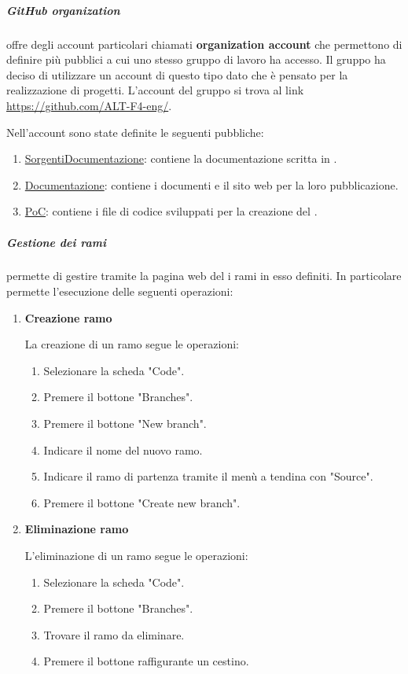 \subparagraph{GitHub organization}
 offre degli account particolari chiamati \textbf{organization account} che permettono di definire più  pubblici a cui uno stesso gruppo di lavoro ha accesso.
Il gruppo ha deciso di utilizzare un account di questo tipo dato che è pensato per la realizzazione di progetti.
L'account del gruppo si trova al link \href{https://github.com/ALT-F4-eng/}{https://github.com/ALT-F4-eng/}.

Nell'account sono state definite le seguenti  pubbliche:
\begin{enumerate}
    \item \href{https://github.com/ALT-F4-eng/SorgentiDocumentazione}{SorgentiDocumentazione}: contiene la documentazione scritta in .
    \item \href{https://github.com/ALT-F4-eng/Documentazione}{Documentazione}: contiene i documenti  e il sito web per la loro pubblicazione.
    \item \href{https://github.com/ALT-F4-eng/PoC}{PoC}: contiene i file di codice sviluppati per la creazione del .
\end{enumerate}

\subparagraph{Gestione dei rami}
 permette di gestire tramite la pagina web del  i rami in esso definiti.
In particolare permette l'esecuzione delle seguenti operazioni:
\begin{enumerate}
    \item \textbf{Creazione ramo}
    
    La creazione di un ramo segue le operazioni:
    \begin{enumerate}
        \item Selezionare la scheda "Code".
        \item Premere il bottone "Branches".
        \item Premere il bottone "New branch".
        \item Indicare il nome del nuovo ramo.
        \item Indicare il ramo di partenza tramite il menù a tendina con  "Source".
        \item Premere il bottone "Create new branch".
    \end{enumerate}

    \item \textbf{Eliminazione ramo}
    
    L'eliminazione di un ramo segue le operazioni:
    \begin{enumerate}
        \item Selezionare la scheda "Code".
        \item Premere il bottone "Branches".
        \item Trovare il ramo da eliminare.
        \item Premere il bottone raffigurante un cestino.
    \end{enumerate}

\end{enumerate}

